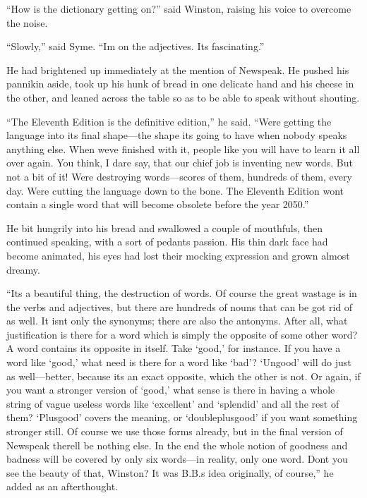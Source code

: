 ``How is the dictionary getting on?'' said Winston, raising his voice to
overcome the noise.

``Slowly,'' said Syme. ``I\textquotesingle m on the adjectives.
It\textquotesingle s fascinating.''

He had brightened up immediately at the mention of Newspeak. He pushed
his pannikin aside, took up his hunk of bread in one delicate hand and
his cheese in the other, and leaned across the table so as to be able to
speak without shouting.

``The Eleventh Edition is the definitive edition,'' he said.
``We\textquotesingle re getting the language into its final shape---the
shape it\textquotesingle s going to have when nobody speaks anything
else. When we\textquotesingle ve finished with it, people like you will
have to learn it all over again. You think, I dare say, that our chief
job is inventing new words. But not a bit of it! We\textquotesingle re
destroying words---scores of them, hundreds of them, every day.
We\textquotesingle re cutting the language down to the bone. The
Eleventh Edition won\textquotesingle t contain a single word that will
become obsolete before the year 2050.''

He bit hungrily into his bread and swallowed a couple of mouthfuls, then
continued speaking, with a sort of pedant\textquotesingle s passion. His
thin dark face had become animated, his eyes had lost their mocking
expression and grown almost dreamy.

``It\textquotesingle s a beautiful thing, the destruction of words. Of
course the great wastage is in the verbs and adjectives, but there are
hundreds of nouns that can be got rid of as well. It isn\textquotesingle t
only the synonyms; there are also the antonyms. After all, what
justification is there for a word which is simply the opposite of some other
word? A word contains its opposite in itself. Take `good,' for instance. If
you have a word like `good,' what need is there for a word like `bad'?
`Ungood' will do just as well---better, because it\textquotesingle s an
exact opposite, which the other is not. Or again, if you want a stronger
version of `good,' what sense is there in having a whole string of vague
useless words like `excellent' and `splendid' and all the rest of them?
`Plusgood' covers the meaning, or `doubleplusgood' if you want something
stronger still. Of course we use those forms already, but in the final
version of Newspeak there\textquotesingle ll be nothing else. In the end the
whole notion of goodness and badness will be covered by only six words---in
reality, only one word. Don\textquotesingle t you see the beauty of that,
Winston? It was B.B.\textquotesingle s idea originally, of course,'' he
added as an afterthought.

